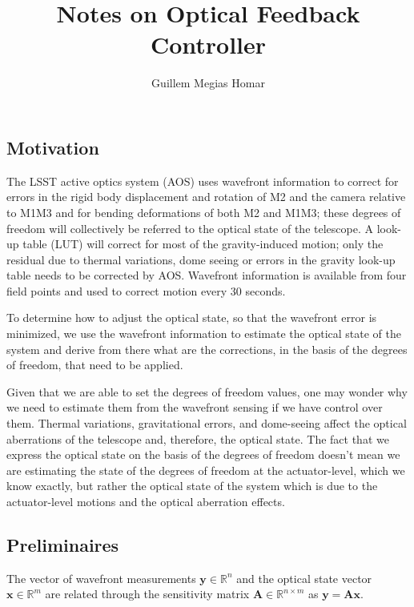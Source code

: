 \documentclass[SE,authoryear,toc]{lsstdoc}
\title{Notes on Optical Feedback Controller}
\author{%
Guillem Megias Homar
}
\date{\vcsDate}
\renewcommand{\v}[1]{\mathbf{#1}}
\begin{document}
\mkshorttitle


\subsection*{Motivation}
The LSST active optics system (AOS) uses wavefront information to correct for errors in the rigid body displacement and rotation of M2 and the camera relative to M1M3 and for bending deformations of both M2 and M1M3; these degrees of freedom will collectively be referred to the optical state of the telescope. A look-up table (LUT) will correct for most of the gravity-induced motion; only the residual due to thermal variations, dome seeing or errors in the gravity look-up table needs to be corrected by AOS. Wavefront information is available from four field points and used to correct motion every 30 seconds. 

To determine how to adjust the optical state, so that the wavefront error is minimized, we use the wavefront information to estimate the optical state of the system and derive from there what are the corrections, in the basis of the degrees of freedom, that need to be applied.

Given that we are able to set the degrees of freedom values, one may wonder why we need to estimate them from the wavefront sensing if we have control over them. Thermal variations, gravitational errors, and dome-seeing affect the optical aberrations of the telescope and, therefore, the optical state. The fact that we express the optical state on the basis of the degrees of freedom doesn't mean we are estimating the state of the degrees of freedom at the actuator-level, which we know exactly, but rather the optical state of the system which is due to the actuator-level motions and the optical aberration effects. 

\subsection*{Preliminaires}
The vector of wavefront measurements $\symbf{y} \in \mathbb{R}^n$ and the optical state vector  $\symbf{x} \in \mathbb{R}^m$ are related through the sensitivity matrix $\v{A} \in \mathbb{R}^{n \times m}$ as $\symbf{y} = \v{A} \symbf{x}$. 
\end{document}
